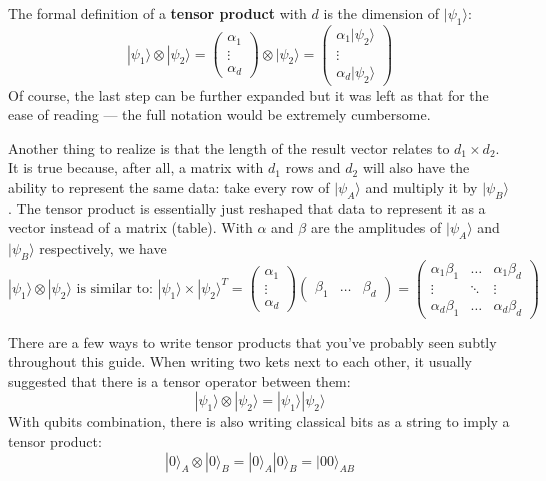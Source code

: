 The formal definition of a \textbf{tensor product} with $d$ is the dimension of $|\psi_1\rangle$:
\begin{equation}
    |\psi_1\rangle \otimes |\psi_2\rangle
    = \begin{pmatrix}
        \alpha_1 \\ \vdots \\ \alpha_d
    \end{pmatrix} \otimes |\psi_2\rangle
    = \begin{pmatrix}
        \alpha_1|\psi_2\rangle \\ \vdots \\ \alpha_d|\psi_2\rangle
    \end{pmatrix}
\end{equation}
Of course, the last step can be further expanded but it was left as that for the ease of reading — the full notation would be extremely cumbersome.

Another thing to realize is that the length of the result vector relates to $d_1 \times d_2$. It is true because, after all, a matrix with $d_1$ rows and $d_2$ will also have the ability to represent the same data: take every row of $|\psi_A\rangle$ and multiply it by $|\psi_B\rangle$. The tensor product is essentially just reshaped that data to represent it as a vector instead of a matrix (table). With $\alpha$ and $\beta$ are the amplitudes of $|\psi_A\rangle$ and $|\psi_B\rangle$ respectively, we have
\[
    |\psi_1\rangle \otimes |\psi_2\rangle
    \text{ is similar to: }
    |\psi_1\rangle \times |\psi_2\rangle^T
    = \begin{pmatrix}
        \alpha_1 \\ \vdots \\ \alpha_d
    \end{pmatrix} \begin{pmatrix}
        \beta_1 & \dots & \beta_d
    \end{pmatrix}
    = \begin{pmatrix}
        \alpha_1\beta_1 & \dots & \alpha_1\beta_d \\
        \vdots & \ddots & \vdots \\
        \alpha_d\beta_1 & \dots & \alpha_d\beta_d
    \end{pmatrix}
\]

There are a few ways to write tensor products that you've probably seen subtly throughout this guide. When writing two kets next to each other, it usually suggested that there is a tensor operator between them:
\begin{equation}
    |\psi_1\rangle \otimes |\psi_2\rangle
    = |\psi_1\rangle |\psi_2\rangle
\end{equation}
With qubits combination, there is also writing classical bits as a string to imply a tensor product:
\begin{equation}
    |0\rangle_A \otimes |0\rangle_B
    = |0\rangle_A |0\rangle_B
    = |00\rangle_{AB}
\end{equation}

